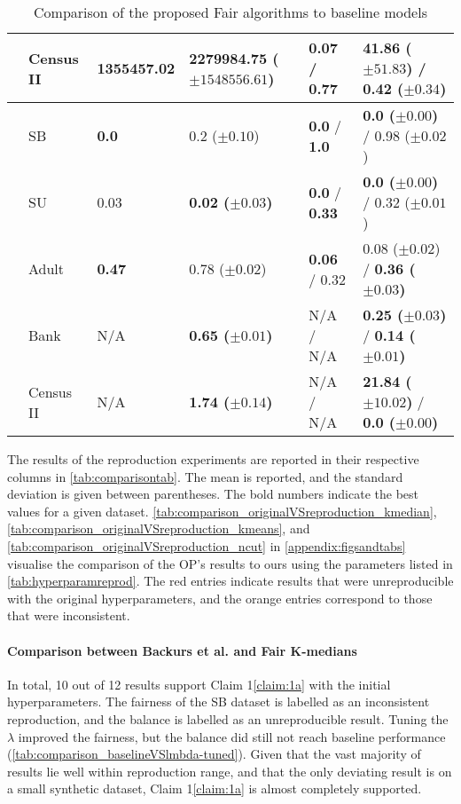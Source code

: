 \begin{table}[]
\begin{tabular}{|m{.3cm}|m{1.4cm}|m{1.5cm}|m{2.2cm}|m{1.4cm}|m{4.3cm}|}
		& Census II & \textbf{1355457.02} 	& 2279984.75 ($\pm 1548556.61$)    		& \textbf{0.07} / \textbf{0.77} & 41.86 ($\pm 51.83$) / 0.42 ($\pm 0.34$) \\\hline
		\multirow{5}{*}{\STAB{\rotatebox[origin=c]{90}{F Ncut}}}
		& SB        & \textbf{0.0} 			& 0.2 ($\pm 0.10$) 						& \textbf{0.0} / \textbf{1.0} 	& \textbf{0.0 ($\pm 0.00$)} / 0.98 ($\pm 0.02$) \\
		& SU 		& 0.03 					& \textbf{0.02 ($\pm 0.03$)} 			& \textbf{0.0} / \textbf{0.33} 	& \textbf{0.0 ($\pm 0.00$)} / 0.32 ($\pm 0.01$) \\
		& Adult     & \textbf{0.47} 		& 0.78 ($\pm 0.02$) 					& \textbf{0.06} / 0.32 			& 0.08 ($\pm 0.02$) / \textbf{0.36 ($\pm 0.03$)} \\
		& Bank      & N/A 					& \textbf{0.65 ($\pm 0.01$)} 			& N/A / N/A 					& \textbf{0.25 ($\pm 0.03$)} / \textbf{0.14 ($\pm 0.01$)} \\
		& Census II & N/A 					& \textbf{1.74 ($\pm 0.14$)} 			& N/A / N/A 					& \textbf{21.84 ($\pm 10.02$)} / \textbf{0.0 ($\pm 0.00$)} \\\hline
	\end{tabular}
	\caption{Comparison of the proposed Fair algorithms to baseline models}
	\label{tab:comparisontab}
\end{table} 




The results of the reproduction experiments are reported in their respective columns in
\autoref{tab:comparisontab}. The mean is reported, and the standard deviation is given between parentheses. The bold numbers indicate the best values for a given dataset.
\autoref{tab:comparison_originalVSreproduction_kmedian}, \autoref{tab:comparison_originalVSreproduction_kmeans}, and \autoref{tab:comparison_originalVSreproduction_ncut} in \autoref{appendix:figsandtabs} visualise the comparison of the OP's results to ours using the parameters listed in \autoref{tab:hyperparamreprod}. The red entries indicate results that were unreproducible with the original hyperparameters, and the orange entries correspond to those that were inconsistent.

\paragraph{Comparison between Backurs et al. and Fair $\mathbf{K}$-medians} In total,
10 out of 12 results support Claim 1\ref{claim:1a} with the initial hyperparameters. The fairness of the SB dataset is labelled as an inconsistent reproduction, and the balance is labelled as an unreproducible result. Tuning the $\lambda$ improved the fairness, but the balance did still not reach baseline performance (\autoref{tab:comparison_baselineVSlmbda-tuned}). Given that the vast majority of results lie well within reproduction range, and that the only deviating result is on a small synthetic dataset, Claim 1\ref{claim:1a} is almost completely supported. 

